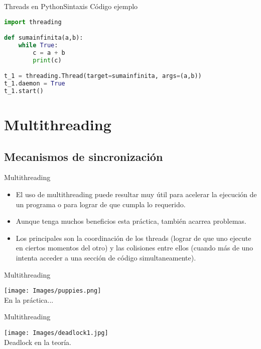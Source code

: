 \documentclass[spanish]{beamer}
\begin{document}
\begin{frame}[fragile]{Threads en Python}{Sintaxis}
  Código ejemplo
  \begin{lstlisting}[language=Python]
import threading

def sumainfinita(a,b):
    while True:
        c = a + b
        print(c)

t_1 = threading.Thread(target=sumainfinita, args=(a,b))
t_1.daemon = True
t_1.start()

  \end{lstlisting}
\end{frame}


\section{Multithreading}

\subsection{Mecanismos de sincronización}

\begin{frame}{Multithreading}
  \begin{itemize}
  \item
    El uso de \alert{multithreading} puede resultar muy útil para acelerar la ejecución de un programa o para lograr de que cumpla lo requerido.
  \item
    Aunque tenga muchos beneficios esta práctica, también acarrea problemas.
  \item
    Los principales son la coordinación de los \alert{threads} (lograr de que uno ejecute en ciertos momentos del otro) y las colisiones entre ellos (cuando más de uno intenta acceder a una sección de código simultaneamente).
  \end{itemize}
\end{frame}

\begin{frame}{Multithreading}
  \begin{center}
    \texttt{[image: Images/puppies.png]}
    \\
    En la práctica...
  \end{center}
\end{frame}

\begin{frame}{Multithreading}
  \begin{center}
    \texttt{[image: Images/deadlock1.jpg]}
    \\
    Deadlock en la teoría.
  \end{center}
\end{frame}
\end{document}
